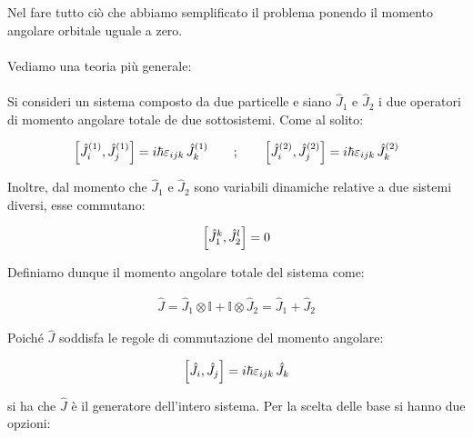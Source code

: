 	Nel fare tutto ciò che abbiamo semplificato il problema ponendo il momento angolare orbitale uguale a zero.
	\\
	\\
	Vediamo una teoria più generale:
	\\
	\\
	Si consideri un sistema composto da due particelle e siano $\hat{J}_1$ e $\hat{J}_2$ i due operatori di momento angolare totale de due sottosistemi. Come al solito:
	
\begin{align*}
	\qty[\hat{J}_i^{\qty(1)}, \hat{J}_j^{\qty(1)}] = i \hbar \varepsilon_{ijk} \, \hat{J}_k^{\qty(1)} \qquad ; \qquad \qty[\hat{J}_i^{\qty(2)}, \hat{J}_j^{\qty(2)}] = i \hbar \varepsilon_{ijk} \,\hat{J}^{\qty(2)}_k
\end{align*}

	Inoltre, dal momento che $\hat{J}_1$ e $\hat{J}_2$ sono variabili dinamiche relative a due sistemi diversi, esse commutano:
	
\begin{align*}
	\qty[\hat{J}_1^k, \hat{J}_2^l] = 0
\end{align*}

	Definiamo dunque il momento angolare totale del sistema come:
	
\begin{align*}
	\hat{J} = \hat{J}_1 \otimes \mathbb{I} + \mathbb{I} \otimes \hat{J}_2 = \hat{J}_1 + \hat{J}_2
\end{align*}

	Poiché $\hat{J}$ soddisfa le regole di commutazione del momento angolare:
	
\begin{align*}
	\qty[ \hat{J}_i, \hat{J}_j] = i \hbar \varepsilon_{ijk} \, \hat{J}_k
\end{align*}

	si ha che $\hat{J}$ è il generatore dell'intero sistema. Per la scelta delle base si hanno due opzioni:
	
